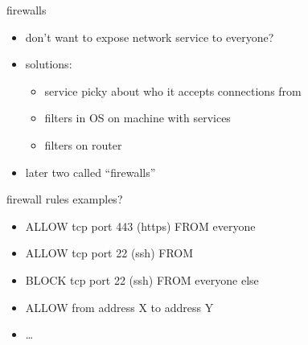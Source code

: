 \begin{frame}{firewalls}
    \begin{itemize}
    \item don't want to expose network service to everyone?
    \item solutions:
        \begin{itemize}
        \item service picky about who it accepts connections from
        \item filters in OS on machine with services
        \item filters on router
        \end{itemize}
    \item later two called ``firewalls''
    \end{itemize}
\end{frame}

\begin{frame}{firewall rules examples?}
    \begin{itemize}
    \item ALLOW tcp port 443 (https) FROM everyone
    \item ALLOW tcp port 22 (ssh) FROM 
    \item BLOCK tcp port 22 (ssh) FROM everyone else
    \item ALLOW from address X to address Y
    \item \ldots
    \end{itemize}
\end{frame}

